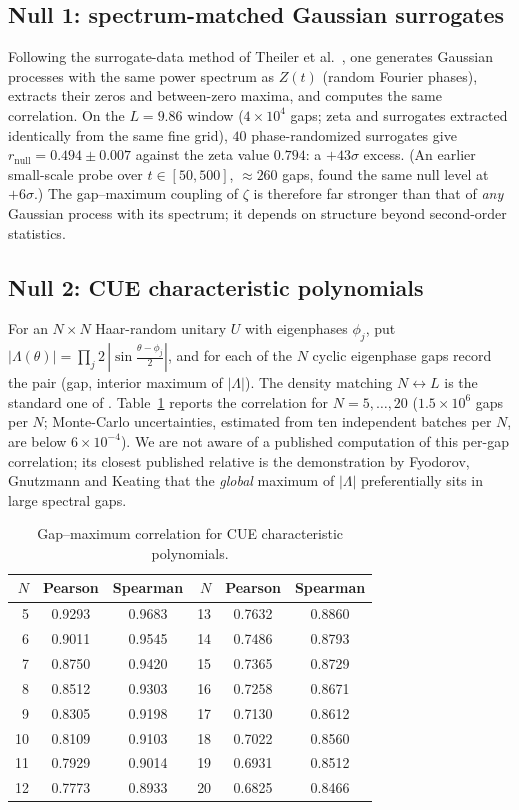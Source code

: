 \documentclass[12pt]{amsart}
\begin{document}
\subsection*{Null 1: spectrum-matched Gaussian surrogates}
Following the surrogate-data method of Theiler et
al.~\cite{Theiler92}, one generates Gaussian processes with the same power
spectrum as $Z(t)$ (random Fourier phases), extracts their zeros and
between-zero maxima, and computes the same correlation. On the $L = 9.86$
window ($4\times10^4$ gaps; zeta and surrogates extracted identically
from the same fine grid), $40$ phase-randomized surrogates give
$r_{\mathrm{null}} = 0.494 \pm 0.007$ against the zeta value $0.794$:
a $+43\sigma$ excess. (An earlier small-scale probe over
$t \in [50, 500]$, $\approx 260$ gaps, found the same null level at
$+6\sigma$.) The
gap--maximum coupling of $\zeta$ is therefore far stronger than that of
\emph{any} Gaussian process with its spectrum; it depends on structure
beyond second-order statistics.

\subsection*{Null 2: CUE characteristic polynomials}
For an $N\times N$ Haar-random unitary $U$ with eigenphases $\phi_j$, put
$|\Lambda(\theta)| = \prod_j 2\,|\sin\frac{\theta-\phi_j}{2}|$, and for
each of the $N$ cyclic eigenphase gaps record the pair (gap, interior
maximum of $|\Lambda|$). The density matching $N \leftrightarrow L$ is the
standard one of \cite{KS00}. Table~\ref{tab:cue} reports the correlation
for $N = 5,\dots,20$ ($1.5\times10^6$ gaps per $N$; Monte-Carlo
uncertainties, estimated from ten independent batches per $N$, are below
$6\times10^{-4}$). We are not aware of a published computation of this
per-gap correlation; its closest published relative is the demonstration
by Fyodorov, Gnutzmann and Keating \cite{FGK18} that the \emph{global}
maximum of $|\Lambda|$ preferentially sits in large spectral gaps.

\begin{table}[ht]
\centering
\caption{Gap--maximum correlation for CUE characteristic polynomials.}
\label{tab:cue}
\begin{tabular}{rcc@{\qquad}rcc}
\toprule
$N$ & Pearson & Spearman & $N$ & Pearson & Spearman \\
\midrule
 5 & 0.9293 & 0.9683 & 13 & 0.7632 & 0.8860 \\
 6 & 0.9011 & 0.9545 & 14 & 0.7486 & 0.8793 \\
 7 & 0.8750 & 0.9420 & 15 & 0.7365 & 0.8729 \\
 8 & 0.8512 & 0.9303 & 16 & 0.7258 & 0.8671 \\
 9 & 0.8305 & 0.9198 & 17 & 0.7130 & 0.8612 \\
10 & 0.8109 & 0.9103 & 18 & 0.7022 & 0.8560 \\
11 & 0.7929 & 0.9014 & 19 & 0.6931 & 0.8512 \\
12 & 0.7773 & 0.8933 & 20 & 0.6825 & 0.8466 \\
\bottomrule
\end{tabular}
\end{table}
\end{document}

